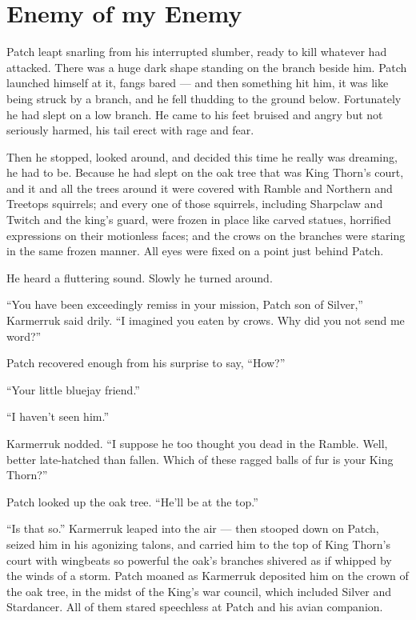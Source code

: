 \documentclass[12pt]{memoir}
\begin{document}

\section{Enemy of my Enemy}

Patch leapt snarling from his interrupted slumber, ready to kill
whatever had attacked. There was a huge dark shape standing on the
branch beside him. Patch launched himself at it, fangs bared — and
then something hit him, it was like being struck by a branch, and he
fell thudding to the ground below. Fortunately he had slept on a low
branch. He came to his feet bruised and angry but not seriously
harmed, his tail erect with rage and fear.

Then he stopped, looked around, and decided this time he really was
dreaming, he had to be. Because he had slept on the oak tree that was
King Thorn’s court, and it and all the trees around it were covered
with Ramble and Northern and Treetops squirrels; and every one of
those squirrels, including Sharpclaw and Twitch and the king’s guard,
were frozen in place like carved statues, horrified expressions on
their motionless faces; and the crows on the branches were staring in
the same frozen manner. All eyes were fixed on a point just behind
Patch.

He heard a fluttering sound. Slowly he turned around.

“You have been exceedingly remiss in your mission, Patch son of
Silver,” Karmerruk said drily. “I imagined you eaten by crows. Why did
you not send me word?”

Patch recovered enough from his surprise to say, “How?”

“Your little bluejay friend.”

“I haven’t seen him.”

Karmerruk nodded. “I suppose he too thought you dead in the
Ramble. Well, better late-hatched than fallen. Which of these ragged
balls of fur is your King Thorn?”

Patch looked up the oak tree. “He’ll be at the top.”

“Is that so.” Karmerruk leaped into the air — then stooped down on
Patch, seized him in his agonizing talons, and carried him to the top
of King Thorn’s court with wingbeats so powerful the oak’s branches
shivered as if whipped by the winds of a storm. Patch moaned as
Karmerruk deposited him on the crown of the oak tree, in the midst of
the King’s war council, which included Silver and Stardancer. All of
them stared speechless at Patch and his avian companion.
\end{document}
